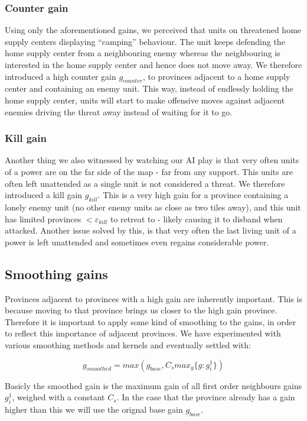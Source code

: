 \documentclass[a4paper]{article} %
\begin{document}
\subsubsection{Counter gain}
\label{sec:countergain}
Using only the aforementioned gains, we perceived that units on threatened home supply centers displaying  ``camping'' behaviour. The unit keeps defending the home supply center from a neighbouring enemy whereas the neighbouring is interested in the home supply center and hence does not move away. We therefore introduced a high counter gain $g_{counter}$, to provinces adjacent to a home supply center and containing an enemy unit. This way, instead of endlessly holding the home supply center, units will start to make offensive moves against adjacent enemies driving the threat away instead of waiting for it to go.        

\subsubsection{Kill gain}
\label{sec:killgain}
Another thing we also witnessed by watching our AI play is that very often units of a power are on the far side of the map - far from any support. This units are often left unattended as a single unit is not considered a threat. We therefore introduced a kill gain $g_{kill}$. This is a very high gain for a province containing a lonely enemy unit (no other enemy units as close as two tiles away), and this unit has limited provinces $< \varepsilon_{kill}$ to retreat to - likely causing it to disband when attacked. 
Another issue solved by this, is that very often the last living unit of a power is left unattended and sometimes even regains considerable power. 

\subsection{Smoothing gains}
Provinces adjacent to provinces with a high gain are inherently important. This is because moving to that province brings us closer to the high gain province. Therefore it is important to apply some kind of smoothing to the gains, in order to reflect this importance of adjacent provinces. We have experimented with various smoothing methods and kernels and eventually settled with: 

$$g_{smoothed} = max(g_{base}, C_{s} max_{g}\{g : g^1_i\})$$

Basicly the smoothed gain is the maximum gain of all first order neighbours gains $g^1_i$, weighed with a constant $C_s$. In the case that the province already has a gain higher than this we will use the orignal base gain $g_{base}$. 
\end{document}
